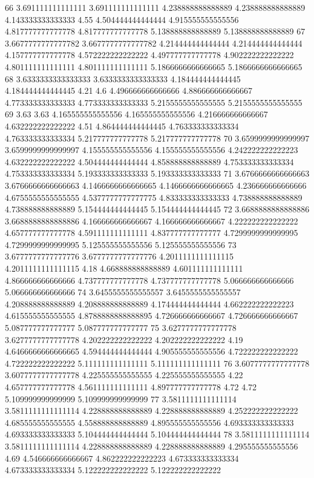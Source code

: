 66 3.691111111111111 3.691111111111111 4.238888888888889 4.238888888888889 4.143333333333333 4.55 4.504444444444444 4.915555555555556 4.817777777777778 4.817777777777778 5.138888888888889 5.138888888888889
67 3.6677777777777782 3.6677777777777782 4.214444444444444 4.214444444444444 4.157777777777778 4.572222222222222 4.497777777777778 4.902222222222222 4.801111111111111 4.801111111111111 5.1866666666666665 5.1866666666666665
68 3.6333333333333333 3.6333333333333333 4.184444444444445 4.184444444444445 4.21 4.6 4.496666666666666 4.886666666666667 4.773333333333333 4.773333333333333 5.2155555555555555 5.2155555555555555
69 3.63 3.63 4.165555555555556 4.165555555555556 4.216666666666667 4.632222222222222 4.51 4.864444444444445 4.763333333333334 4.763333333333334 5.217777777777778 5.217777777777778
70 3.6599999999999997 3.6599999999999997 4.155555555555556 4.155555555555556 4.242222222222223 4.632222222222222 4.504444444444444 4.858888888888889 4.753333333333334 4.753333333333334 5.193333333333333 5.193333333333333
71 3.6766666666666663 3.6766666666666663 4.1466666666666665 4.1466666666666665 4.236666666666666 4.6755555555555555 4.5377777777777775 4.833333333333333 4.738888888888889 4.738888888888889 5.154444444444445 5.154444444444445
72 3.6688888888888886 3.6688888888888886 4.166666666666667 4.166666666666667 4.222222222222222 4.657777777777778 4.591111111111111 4.837777777777777 4.7299999999999995 4.7299999999999995 5.125555555555556 5.125555555555556
73 3.6777777777777776 3.6777777777777776 4.2011111111111115 4.2011111111111115 4.18 4.668888888888889 4.601111111111111 4.866666666666666 4.737777777777778 4.737777777777778 5.066666666666666 5.066666666666666
74 3.6455555555555557 3.6455555555555557 4.208888888888889 4.208888888888889 4.174444444444444 4.662222222222223 4.615555555555555 4.8788888888888895 4.726666666666667 4.726666666666667 5.087777777777777 5.087777777777777
75 3.6277777777777778 3.6277777777777778 4.202222222222222 4.202222222222222 4.19 4.6466666666666665 4.594444444444444 4.905555555555556 4.722222222222222 4.722222222222222 5.111111111111111 5.111111111111111
76 3.6077777777777778 3.6077777777777778 4.225555555555555 4.225555555555555 4.22 4.657777777777778 4.561111111111111 4.897777777777778 4.72 4.72 5.109999999999999 5.109999999999999
77 3.5811111111111114 3.5811111111111114 4.228888888888889 4.228888888888889 4.252222222222222 4.685555555555555 4.558888888888889 4.895555555555556 4.693333333333333 4.693333333333333 5.104444444444444 5.104444444444444
78 3.5811111111111114 3.5811111111111114 4.228888888888889 4.228888888888889 4.295555555555556 4.69 4.546666666666667 4.862222222222223 4.673333333333334 4.673333333333334 5.122222222222222 5.122222222222222
